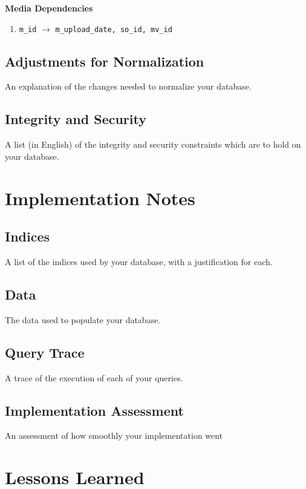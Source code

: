 \documentclass[11pt, a4paper]{report}
\begin{document}
\noindent\textbf{Media Dependencies}
\begin{enumerate}
\item \texttt{m\_id} $\longrightarrow$ \texttt{m\_upload\_date, so\_id, mv\_id}

\end{enumerate}

\clearpage
\section{Adjustments for Normalization}
    An explanation of the changes needed to normalize your database.

\clearpage
\section{Integrity and Security}
    A list (in English) of the integrity and security constraints which are to hold on your database.

\chapter{Implementation Notes}

\clearpage
\section{Indices}
    A list of the indices used by your database, with a justification for each.

\clearpage
\section{Data}
    The data used to populate your database.

\clearpage
\section{Query Trace}
    A trace of the execution of each of your queries.

\clearpage
\section{Implementation Assessment}
    An assessment of how smoothly your implementation went

\chapter{Lessons Learned}
\end{document}
